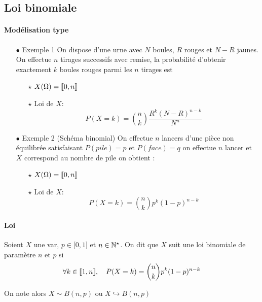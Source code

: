 \documentclass[a4paper, 11pt]{article}
\begin{document}
\subsection{Loi binomiale}



\paragraph{Mod\'elisation type}
\begin{enumerate}
\item [$\bullet$] Exemple 1 On dispose d'une urne avec $N$ boules, $R$ rouges et $N-R$ jaunes. On effectue $n$ tirages successifs avec remise, la probabilité d'obtenir exactement $k$ boules rouges parmi les $n$ tirages est 

\begin{itemize}
\item[$\star$] $X(\Omega)=\llbracket 0,n\rrbracket$
\item[$\star$] Loi de $X$:
$$P(X=k ) = \binom{n}{k} \frac{R^k(N-R)^{n-k}}{N^n}$$

\end{itemize}

\item [$\bullet$] Exemple 2 (Sch\'ema binomial) On effectue $n$ lancers d'une pièce non équilibrée satisfaisant $P( pile) =p $ et $P(face)= q$ on effectue $n$ lancer et $X$ correspond au nombre de pile on obtient : 

\begin{itemize}
\item[$\star$] $X(\Omega)=\llbracket 0,n\rrbracket$
\item[$\star$] Loi de $X$:
$$P(X=k ) = \binom{n}{k} p^k(1-p)^{n-k}$$

\end{itemize}
\end{enumerate}





\paragraph{Loi}


\hspace{-0.7cm}  {  

\begin{defi} Soient $X$ une var, $p\in\lbrack 0,1\rbrack$ et $n\in\mathbb{N}^{\star}$. On dit que $X$ suit une loi binomiale de param\`{e}tre $n$ et $p$ si
$$\forall k\in \llbracket 1,n\rrbracket, \quad P(X=k ) = \binom{n}{k} p^k(1-p)^{n-k}$$

 On note alors $X\sim B(n,p) $ ou $X\hookrightarrow B(n,p)$
\end{defi}
 
}
 
\end{document}
